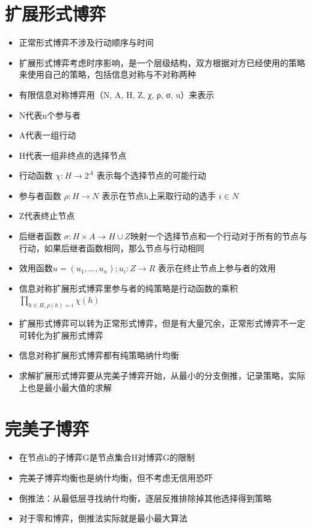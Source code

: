 \documentclass[]{book}
\providecommand{\tightlist}{%
  \setlength{\itemsep}{0pt}\setlength{\parskip}{0pt}}
\begin{document}
\section{扩展形式博弈}

\begin{itemize}
\tightlist
\item
  正常形式博弈不涉及行动顺序与时间
\item
  扩展形式博弈考虑时序影响，是一个层级结构，双方根据对方已经使用的策略来使用自己的策略，包括信息对称与不对称两种
\item
  有限信息对称博弈用（N, A, H, Z, χ, ρ, σ, u）来表示
\item
  N代表n个参与者
\item
  A代表一组行动
\item
  H代表一组非终点的选择节点
\item
  行动函数 \(\chi:H \rightarrow 2^A\) 表示每个选择节点的可能行动
\item
  参与者函数 \(\rho:H \rightarrow N\) 表示在节点h上采取行动的选手 \(i\in N\)
\item
  Z代表终止节点
\item
  后继者函数 \(\sigma:H\times A\rightarrow H \cup Z\)映射一个选择节点和一个行动对于所有的节点与行动，如果后继者函数相同，那么节点与行动相同
\item
  效用函数\(u=(u_1,...,u_n);u_i:Z\rightarrow R\) 表示在终止节点上参与者的效用
\item
  信息对称扩展形式博弈里参与者的纯策略是行动函数的乘积\(\prod_{h\in H,\rho(h)=i}\chi(h)\)
\item
  扩展形式博弈可以转为正常形式博弈，但是有大量冗余，正常形式博弈不一定可转化为扩展形式博弈
\item
  信息对称扩展形式博弈都有纯策略纳什均衡
\item
  求解扩展形式博弈要从完美子博弈开始，从最小的分支倒推，记录策略，实际上也是最小最大值的求解
\end{itemize}

\section{完美子博弈}

\begin{itemize}
\tightlist
\item
  在节点h的子博弈G是节点集合H对博弈G的限制
\item
  完美子博弈均衡也是纳什均衡，但不考虑无信用恐吓
\item
  倒推法：从最低层寻找纳什均衡，逐层反推排除掉其他选择得到策略
\item
  对于零和博弈，倒推法实际就是最小最大算法
\end{itemize}
\end{document}
